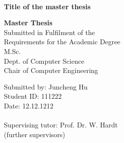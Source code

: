 \documentclass[a4paper, 12pt, oneside, BCOR1cm,toc=chapterentrywithdots]{scrbook}
\begin{document}
%
%

\begin{titlepage}

{
    \begin{center}
        \\
    \end{center}
    \vspace{0.5cm}
}

\begin{center}

\LARGE{\textbf{Title of the master thesis}}\\
\vspace{1cm}


\Large{\textbf{Master Thesis}}\\ 
\vspace{1cm}
Submitted in Fulfilment of the\\
Requirements for the Academic Degree\\
M.Sc.\\
\vspace{0.5cm}
Dept. of Computer Science\\
Chair of Computer Engineering
\end{center}
\vspace{3cm}
Submitted by: Juncheng Hu\\
Student ID: 111222\\
Date: 12.12.1212\\
\vspace{0.3cm}\\
Supervising tutor: Prof. Dr. W. Hardt \\
(further supervisors)

\end{titlepage}
\end{document}
